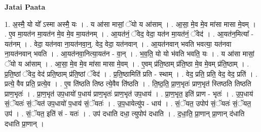\documentclass[17pt]{extarticle}
\begin{document}
\textbf{Jatai Paata} \newline

1. अ॒स्मै॒ यो यो᳚ ऽस्मा अस्मै॒ यः । . य आ॑सा मासां॒ ॅयो य आ॑साम् । . आ॒सा॒ मे॒व मे॒व मा॑सा मासा मे॒वम् । . ए॒व मा॒यत॑न मा॒यत॑न मे॒व मे॒व मा॒यत॑नम् । . आ॒यत॑नं॒ ॅवेद॒ वेदा॒ यत॑न मा॒यत॑नं॒ ॅवेद॑ । . आ॒यत॑न॒मित्या᳚ - यत॑नम् । . वेदा॒ यत॑नवा ना॒यत॑नवा॒न्॒. वेद॒ वेदा॒ यत॑नवान् । . आ॒यत॑नवान् भवति भवत्या॒ यत॑नवा ना॒यत॑नवान् भवति । . आ॒यत॑नवा॒नित्या॒यत॑न - वा॒न् । . भ॒व॒ति॒ यो यो भ॑वति भवति॒ यः । . य आ॑सा मासां॒ ॅयो य आ॑साम् । . आ॒सा॒ मे॒व मे॒व मा॑सा मासा मे॒वम् । . ए॒वम् प्र॑ति॒ष्ठाम् प्र॑ति॒ष्ठा मे॒व मे॒वम् प्र॑ति॒ष्ठाम् । . प्र॒ति॒ष्ठां ॅवेद॒ वेद॑ प्रति॒ष्ठाम् प्र॑ति॒ष्ठां ॅवेद॑ । . प्र॒ति॒ष्ठामिति॑ प्रति - स्थाम् । . वेद॒ प्रति॒ प्रति॒ वेद॒ वेद॒ प्रति॑ । . प्रत्ये॒ वैव प्रति॒ प्रत्ये॒व । . ए॒व ति॑ष्ठति तिष्ठ त्ये॒वैव ति॑ष्ठति । . ति॒ष्ठ॒ति॒ प्रा॒ण॒भृतः॑ प्राण॒भृत॑ स्तिष्ठति तिष्ठति प्राण॒भृतः॑ । . प्रा॒ण॒भृत॑ उप॒धायो॑ प॒धाय॑ प्राण॒भृतः॑ प्राण॒भृत॑ उप॒धाय॑ । . प्रा॒ण॒भृत॒ इति॑ प्राण - भृतः॑ । . उ॒प॒धाय॑ सं॒ॅयतः॑ सं॒ॅयत॑ उप॒धायो॑ प॒धाय॑ सं॒ॅयतः॑ । . उ॒प॒धायेत्यु॑प - धाय॑ । . सं॒ॅयत॒ उपोप॑ सं॒ॅयतः॑ सं॒ॅयत॒ उप॑ । . सं॒ॅयत॒ इति॑ सं - यतः॑ । . उप॑ दधाति दधा॒ त्युपोप॑ दधाति । . द॒धा॒ति॒ प्रा॒णान् प्रा॒णान् द॑धाति दधाति प्रा॒णान् । \newline
\end{document}
